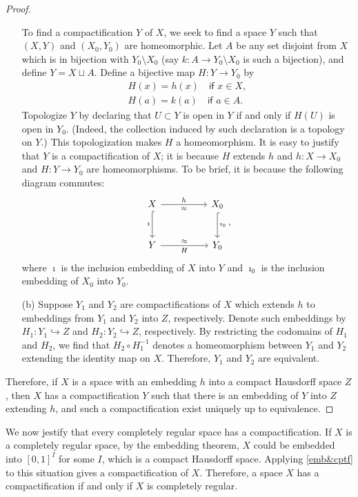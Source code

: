 \begin{proof}
\begin{enumerate}
{            To find a compactification $Y$ of $X$, we seek to find a space $Y$ such that $(X, Y)$ and $(X_0, Y_0)$ are homeomorphic.
            Let $A$ be any set disjoint from $X$ which is in bijection with $Y_0\setminus X_0$ (say $k: A\rightarrow Y_0\setminus X_0$ is such a bijection), and define $Y=X\sqcup A$.
            Define a bijective map $H: Y\rightarrow Y_0$ by
            \begin{align*}
                H(x)=h(x)\quad\textsf{if } x\in X,\\
                H(a)=k(a)\quad\textsf{if } a\in A.
            \end{align*}
            Topologize $Y$ by declaring that $U\subset Y$ is open in $Y$ if and only if $H(U)$ is open in $Y_0$. (Indeed, the collection induced by such declaration is a topology on $Y$.)
            This topologization makes $H$ a homeomorphism.
            It is easy to justify that $Y$ is a compactification of $X$; it is because $H$ extends $h$ and $h: X\rightarrow X_0$ and $H: Y\rightarrow Y_0$ are homeomorphisms.
            To be brief, it is because the following diagram commutes:
            \begin{equation*}
                \begin{tikzcd}[row sep=large, column sep=huge]
                    X\arrow[r, "h", "\approx"']\arrow[d, "\imath"', hook]
                    &
                    X_0\arrow[d, "\imath_0", hook]\\
                    Y\arrow[r, "\approx", "H"'] & Y_0
                \end{tikzcd},
            \end{equation*}
            where $\imath$ is the inclusion embedding of $X$ into $Y$ and $\imath_0$ is the inclusion embedding of $X_0$ into $Y_0$.
        }
        \item[(b)]
        {
            Suppose $Y_1$ and $Y_2$ are compactifications of $X$ which extends $h$ to embeddings from $Y_1$ and $Y_2$ into $Z$, respectively.
            Denote such embeddings by $H_1: Y_1\hookrightarrow Z$ and $H_2: Y_2\hookrightarrow Z$, respectively.
            By restricting the codomains of $H_1$ and $H_2$, we find that $H_2\circ H_1^{-1}$ denotes a homeomorphism between $Y_1$ and $Y_2$ extending the identity map on $X$.
            Therefore, $Y_1$ and $Y_2$ are equivalent.
        }
    \end{enumerate}
    Therefore, if $X$ is a space with an embedding $h$ into a compact Hausdorff space $Z$, then $X$ has a compactification $Y$ such that there is an embedding of $Y$ into $Z$ extending $h$, and such a compactification exist uniquely up to equivalence.
\end{proof}
\begin{rmk}
    We now jestify that every completely regular space has a compactification.
    If $X$ is a completely regular space, by the embedding theorem, $X$ could be embedded into $[0, 1]^I$ for some $I$, which is a compact Hausdorff space.
    Applying \cref{emb&cptf} to this situation gives a compactification of $X$.
    Therefore, a space $X$ has a compactification if and only if $X$ is completely regular.
\end{rmk}
